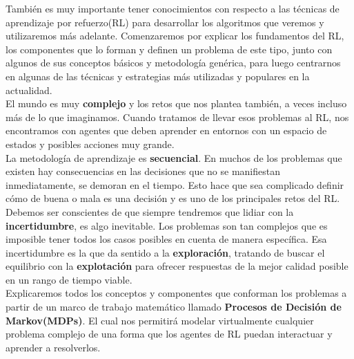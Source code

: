 \documentclass[11pt,fleqn]{book} %
\begin{document}
También es muy importante tener conocimientos con respecto a las técnicas de aprendizaje por refuerzo(RL) para desarrollar los algoritmos que veremos y utilizaremos más adelante. Comenzaremos por explicar los fundamentos del RL, los componentes que lo forman y definen un problema de este tipo, junto con algunos de sus conceptos básicos y metodología genérica, para luego centrarnos en algunas de las técnicas y estrategias más utilizadas y populares en la actualidad. \\

El mundo es muy \textbf{complejo} y los retos que nos plantea también, a veces incluso más de lo que imaginamos. Cuando tratamos de llevar esos problemas al RL, nos encontramos con agentes que deben aprender en entornos con un espacio de estados y posibles acciones muy grande. \\

La metodología de aprendizaje es \textbf{secuencial}. En muchos de los problemas que existen hay consecuencias en las decisiones que no se manifiestan inmediatamente, se demoran en el tiempo. Esto hace que sea complicado definir cómo de buena o mala es una decisión y es uno de los principales retos del RL. \\

Debemos ser conscientes de que siempre tendremos que lidiar con la \textbf{incertidumbre}, es algo inevitable. Los problemas son tan complejos que es imposible tener todos los casos posibles en cuenta de manera específica. Esa incertidumbre es la que da sentido a la \textbf{exploración}, tratando de buscar el equilibrio con la \textbf{explotación} para ofrecer respuestas de la mejor calidad posible en un rango de tiempo viable.\\

Explicaremos todos los conceptos y componentes que conforman los problemas a partir de un marco de trabajo matemático llamado \textbf{Procesos de Decisión de Markov(MDPs)}. El cual nos permitirá modelar virtualmente cualquier problema complejo de una forma que los agentes de RL puedan interactuar y aprender a resolverlos. \cite{book:miguel} \cite{article:RLromero} \cite{book:barto}  \\ 

\end{document}
